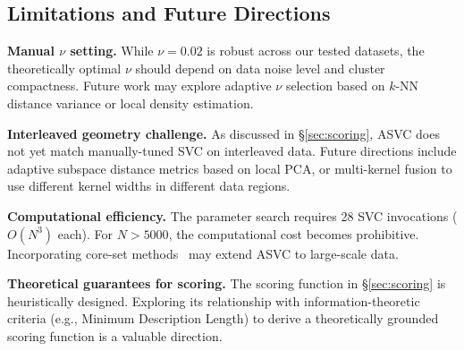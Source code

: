 \subsection{Limitations and Future Directions}

\textbf{Manual $\nu$ setting.} While $\nu\!=\!0.02$ is robust across our tested datasets, the theoretically optimal $\nu$ should depend on data noise level and cluster compactness. Future work may explore adaptive $\nu$ selection based on $k$-NN distance variance or local density estimation.

\textbf{Interleaved geometry challenge.} As discussed in \S\ref{sec:scoring}, ASVC does not yet match manually-tuned SVC on interleaved data. Future directions include adaptive subspace distance metrics based on local PCA, or multi-kernel fusion to use different kernel widths in different data regions.

\textbf{Computational efficiency.} The parameter search requires 28 SVC invocations ($O(N^3)$ each). For $N\!>\!5000$, the computational cost becomes prohibitive. Incorporating core-set methods~\cite{tsang2006} may extend ASVC to large-scale data.

\textbf{Theoretical guarantees for scoring.} The scoring function in \S\ref{sec:scoring} is heuristically designed. Exploring its relationship with information-theoretic criteria (e.g., Minimum Description Length) to derive a theoretically grounded scoring function is a valuable direction.
